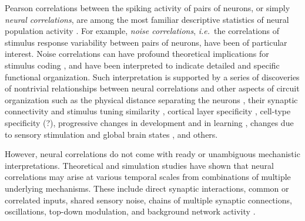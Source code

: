 Pearson correlations between the spiking activity of pairs of neurons, or simply \emph{neural correlations}, are among the most familiar descriptive statistics of neural population activity \cite{Averbeck:2006,Zohary:1994,Kohn:2005,Bair:2001,Renart:2010}.  For example, \emph{noise correlations}, \emph{i.e.}~the correlations of stimulus response variability between pairs of neurons, have been of particular interest.  Noise correlations can have profound theoretical implications for stimulus coding \cite{Zohary:1994,Abbott:1999,Averbeck:2006,Berens:2011,Ecker:2011}, and have been interpreted to indicate detailed and specific functional organization. Such interpretation is supported by a series of discoveries of nontrivial relationships between neural correlations and other aspects of circuit organization such as the physical distance separating the neurons \cite{Smith:2008,Denman:2013}, their synaptic connectivity and stimulus tuning similarity \cite{Kohn:2005,Ko:2011}, cortical layer specificity \cite{Hansen:2012,Smith:2013}, cell-type specificity (?), progressive changes in development and in learning \cite{Golshani:2009}, changes due to sensory stimulation and global brain states \cite{Goard:2009,Kohn:2009,Ecker:2010,Renart:2010}, and others.

However, neural correlations do not come with ready or unambiguous mechanistic interpretations.  Theoretical and simulation studies have shown that neural correlations may arise at various temporal scales from combinations of multiple underlying mechanisms.  These include direct synaptic interactions, common or correlated inputs, shared sensory noise, chains of multiple synaptic connections, oscillations, top-down modulation, and background network activity \cite{Perkel:1967b,Shadlen:1998,Salinas:2001,Ostojic:2009,Rosenbaum:2011}.

